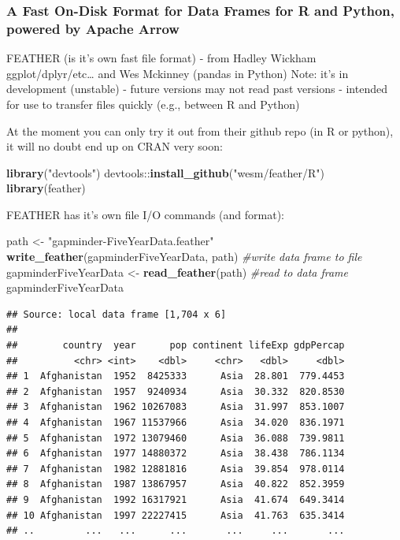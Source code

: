 \documentclass[]{article}
\newenvironment{Shaded}{\begin{snugshade}}{\end{snugshade}}
\newcommand{\KeywordTok}[1]{\textcolor[rgb]{0.13,0.29,0.53}{\textbf{{#1}}}}
\newcommand{\StringTok}[1]{\textcolor[rgb]{0.31,0.60,0.02}{{#1}}}
\newcommand{\CommentTok}[1]{\textcolor[rgb]{0.56,0.35,0.01}{\textit{{#1}}}}
\newcommand{\NormalTok}[1]{{#1}}
\begin{document}
\subsubsection{A Fast On-Disk Format for Data Frames for R and Python,
powered by Apache
Arrow}\label{a-fast-on-disk-format-for-data-frames-for-r-and-python-powered-by-apache-arrow}

FEATHER (is it's own fast file format) - from Hadley Wickham
ggplot/dplyr/etc\ldots{} and Wes Mckinney (pandas in Python) Note: it's
in development (unstable) - future versions may not read past versions -
intended for use to transfer files quickly (e.g., between R and Python)

At the moment you can only try it out from their github repo (in R or
python), it will no doubt end up on CRAN very soon:

\begin{Shaded}
\begin{Highlighting}[]
\KeywordTok{library}\NormalTok{(}\StringTok{"devtools"}\NormalTok{)}
\NormalTok{devtools::}\KeywordTok{install_github}\NormalTok{(}\StringTok{"wesm/feather/R"}\NormalTok{)}
\KeywordTok{library}\NormalTok{(feather)}
\end{Highlighting}
\end{Shaded}

FEATHER has it's own file I/O commands (and format):

\begin{Shaded}
\begin{Highlighting}[]
\NormalTok{path <-}\StringTok{ "gapminder-FiveYearData.feather"}
\KeywordTok{write_feather}\NormalTok{(gapminderFiveYearData, path) }\CommentTok{#write data frame to file}
\NormalTok{gapminderFiveYearData <-}\StringTok{ }\KeywordTok{read_feather}\NormalTok{(path) }\CommentTok{#read to data frame}
\NormalTok{gapminderFiveYearData}
\end{Highlighting}
\end{Shaded}

\begin{verbatim}
## Source: local data frame [1,704 x 6]
## 
##        country  year      pop continent lifeExp gdpPercap
##          <chr> <int>    <dbl>     <chr>   <dbl>     <dbl>
## 1  Afghanistan  1952  8425333      Asia  28.801  779.4453
## 2  Afghanistan  1957  9240934      Asia  30.332  820.8530
## 3  Afghanistan  1962 10267083      Asia  31.997  853.1007
## 4  Afghanistan  1967 11537966      Asia  34.020  836.1971
## 5  Afghanistan  1972 13079460      Asia  36.088  739.9811
## 6  Afghanistan  1977 14880372      Asia  38.438  786.1134
## 7  Afghanistan  1982 12881816      Asia  39.854  978.0114
## 8  Afghanistan  1987 13867957      Asia  40.822  852.3959
## 9  Afghanistan  1992 16317921      Asia  41.674  649.3414
## 10 Afghanistan  1997 22227415      Asia  41.763  635.3414
## ..         ...   ...      ...       ...     ...       ...
\end{verbatim}
\end{document}

